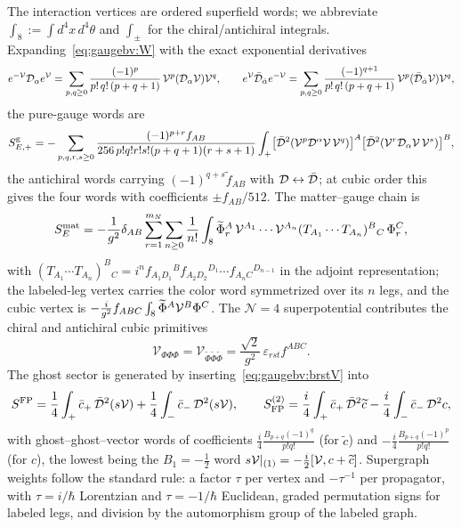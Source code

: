 The interaction vertices are ordered superfield words; we abbreviate $\int_8:=\int d^4x\,d^4\theta$ and $\int_\pm$ for the chiral/antichiral integrals. Expanding~\eqref{eq:gaugebv:W} with the exact exponential derivatives
\begin{equation}\label{eq:gaugebv:expderivative}
e^{-\mathcal{V}}\mathcal{D}_\alpha e^{\mathcal{V}}=\sum_{p,q\ge0}\frac{(-1)^p}{p!\,q!\,(p+q+1)}\,\mathcal{V}^p(\mathcal{D}_\alpha\mathcal{V})\mathcal{V}^q,\qquad
e^{\mathcal{V}}\bar{\mathcal{D}}_{\dot\alpha}e^{-\mathcal{V}}=\sum_{p,q\ge0}\frac{(-1)^{q+1}}{p!\,q!\,(p+q+1)}\,\mathcal{V}^p(\bar{\mathcal{D}}_{\dot\alpha}\mathcal{V})\mathcal{V}^q,
\end{equation}
the pure-gauge words are
\begin{equation}\label{eq:gaugebv:gaugevertex}
S^{\rm g}_{E,+}=-\sum_{p,q,r,s\ge0}
\frac{(-1)^{p+r}f_{AB}}{256\,p!q!r!s!(p+q+1)(r+s+1)}
\int_+\bigl[\bar{\mathcal{D}}^2(\mathcal{V}^p\mathcal{D}^\alpha\mathcal{V}\,\mathcal{V}^q)\bigr]^A
\bigl[\bar{\mathcal{D}}^2(\mathcal{V}^r\mathcal{D}_\alpha\mathcal{V}\,\mathcal{V}^s)\bigr]^B,
\end{equation}
the antichiral words carrying $(-1)^{q+s}\widetilde f_{AB}$ with $\mathcal{D}\leftrightarrow\bar{\mathcal{D}}$; at cubic order this gives the four words with coefficients $\pm f_{AB}/512$. The matter--gauge chain is
\begin{equation}\label{eq:gaugebv:matchain}
S^{\rm mat}_E=-\frac1{g^2}\delta_{AB}\sum_{r=1}^{m_N}\sum_{n\ge0}\frac1{n!}
\int_8\widetilde\Phi_r^A\,\mathcal{V}^{A_1}\cdots\mathcal{V}^{A_n}(T_{A_1}\cdots T_{A_n})^B{}_C\,\Phi_r^C,
\end{equation}
with $(T_{A_1}\cdots T_{A_n})^B{}_C=i^nf_{A_1D_1}{}^Bf_{A_2D_2}{}^{D_1}\cdots f_{A_nC}{}^{D_{n-1}}$ in the adjoint representation; the labeled-leg vertex carries the color word symmetrized over its $n$ legs, and the cubic vertex is $-\tfrac{i}{g^2}f_{ABC}\int_8\widetilde\Phi^A\mathcal{V}^B\Phi^C$. The $\mathcal N=4$ superpotential contributes the chiral and antichiral cubic primitives
\begin{equation}\label{eq:gaugebv:Wcubic}
\mathcal V_{\Phi\Phi\Phi}=\mathcal V_{\widetilde\Phi\widetilde\Phi\widetilde\Phi}=\frac{\sqrt2}{g^2}\,\varepsilon_{rst}f^{ABC}.
\end{equation}
The ghost sector is generated by inserting~\eqref{eq:gaugebv:brstV} into
\begin{equation}\label{eq:gaugebv:ghost}
S^{\rm FP}=\frac14\int_+\bar c_+\,\bar{\mathcal{D}}^2(s\mathcal{V})+\frac14\int_-\bar c_-\,\mathcal{D}^2(s\mathcal{V}),\qquad
S^{(2)}_{\rm FP}=\frac i4\int_+\bar c_+\,\bar{\mathcal{D}}^2\widetilde c-\frac i4\int_-\bar c_-\,\mathcal{D}^2c,
\end{equation}
with ghost--ghost--vector words of coefficients $\tfrac i4\tfrac{B_{p+q}(-1)^q}{p!q!}$ (for $\widetilde c$) and $-\tfrac i4\tfrac{B_{p+q}(-1)^p}{p!q!}$ (for $c$), the lowest being the $B_1=-\tfrac12$ word $s\mathcal{V}|_{(1)}=-\tfrac i2[\mathcal{V},c+\widetilde c]$. Supergraph weights follow the standard rule: a factor $\tau$ per vertex and $-\tau^{-1}$ per propagator, with $\tau=i/\hbar$ Lorentzian and $\tau=-1/\hbar$ Euclidean, graded permutation signs for labeled legs, and division by the automorphism group of the labeled graph.

